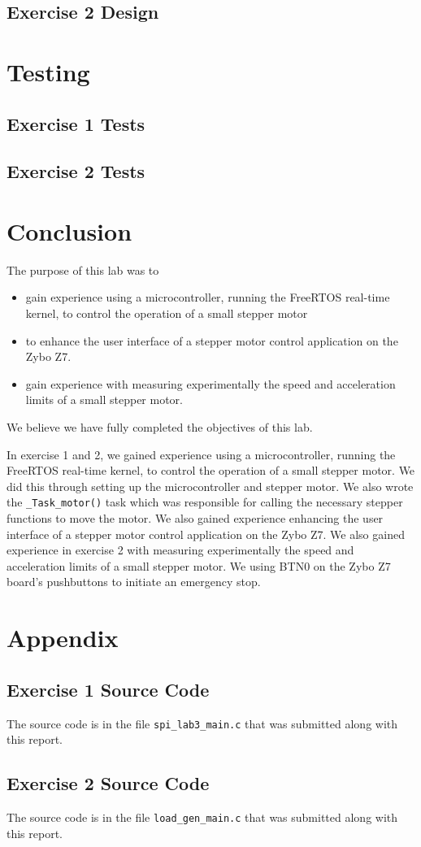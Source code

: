\documentclass[11pt, letterpaper, titlepage]{article}
\begin{document}
\subsection{Exercise 2 Design}


\section{Testing}

\subsection{Exercise 1 Tests}

\subsection{Exercise 2 Tests}

\section{Conclusion}
The purpose of this lab was to 
\begin{itemize}
  \item gain experience using a microcontroller, running the FreeRTOS real-time kernel, to control the operation of a small stepper motor
  \item to enhance the user interface of a stepper motor control application on the Zybo Z7.
  \item gain experience with measuring experimentally the speed and acceleration limits of a small stepper motor.
\end{itemize}

We believe we have fully completed the objectives of this lab.

In exercise 1 and 2, we gained experience using a microcontroller, running the FreeRTOS real-time kernel, to control the operation of a small stepper motor. We did this through setting up the microcontroller and stepper motor. We also wrote the \texttt{_Task_motor()} task which was responsible for calling the necessary stepper functions to move the motor. We also gained experience enhancing the user interface of a stepper motor control application on the Zybo Z7. We also gained experience in exercise 2 with measuring experimentally the speed and acceleration limits of a small stepper motor. We using BTN0 on the Zybo Z7 board's pushbuttons to initiate an emergency stop.

\section{Appendix}

\subsection{Exercise 1 Source Code}
The source code is in the file \texttt{spi_lab3_main.c} that was submitted along with this report.

\subsection{Exercise 2 Source Code}
The source code is in the file \texttt{load_gen_main.c} that was submitted along with this report.
\end{document}
